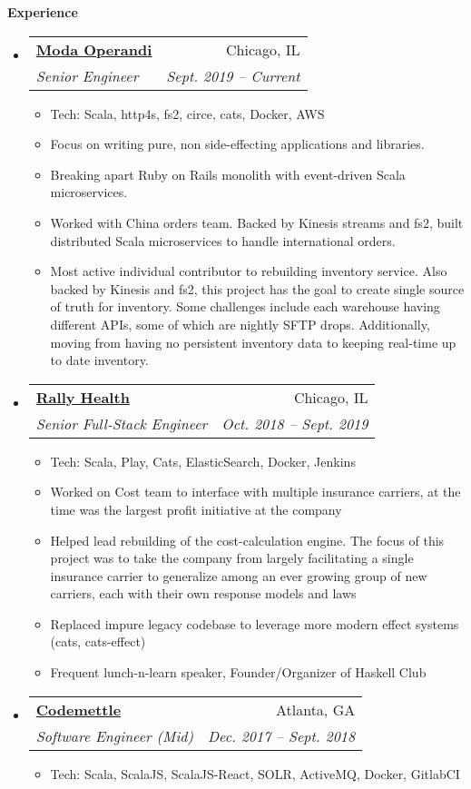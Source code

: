 \documentclass[letterpaper,11pt]{article}
\makeatletter
\newcommand{\resitem}[1]{\item #1 \vspace{-2pt}}
\newcommand{\resheading}[1]{{\large \colorbox{mygrey}{\begin{minipage}{\textwidth}{\textbf{#1 \vphantom{p\^{E}}}}\end{minipage}}}}
\newcommand{\ressubheading}[4]{
\begin{tabular*}{6.5in}{l@{\extracolsep{\fill}}r}
		\textbf{#1} & #2 \\
		\textit{#3} & \textit{#4} \\
\end{tabular*}\vspace{-6pt}}
\makeatother
\begin{document}
\resheading{Experience}
\begin{itemize}
\item
  \ressubheading{\href{http://www.modaoperandi.com/}{Moda Operandi}}{Chicago, IL}{Senior Engineer}{Sept. 2019 -- Current}
    { \footnotesize
    \begin{itemize}
        \resitem{Tech: Scala, http4s, fs2, circe, cats, Docker, AWS}
        \resitem{Focus on writing pure, non side-effecting applications and libraries.}
        \resitem{Breaking apart Ruby on Rails monolith with event-driven Scala microservices.}
        \resitem{Worked with China orders team. Backed by Kinesis streams and fs2, built distributed Scala
        microservices to handle international orders.}
        \resitem{Most active individual contributor to rebuilding inventory
        service. Also backed by Kinesis and fs2, this project has the goal to
        create single source of truth for inventory. Some challenges include
        each warehouse having different APIs, some of which are nightly SFTP
        drops.  Additionally, moving from having no persistent inventory data
        to keeping real-time up to date inventory.}
    \end{itemize}
    }
\item
  \ressubheading{\href{http://www.rallyhealth.com/}{Rally Health}}{Chicago, IL}{Senior Full-Stack Engineer}{Oct. 2018 -- Sept. 2019}
    { \footnotesize
    \begin{itemize}
        \resitem{Tech: Scala, Play, Cats, ElasticSearch, Docker, Jenkins}
        \resitem{Worked on Cost team to interface with multiple insurance carriers, at the time was the largest profit initiative at the company}
        \resitem{Helped lead rebuilding of the cost-calculation engine. The focus of this project was to take the company from largely 
        facilitating a single insurance carrier to generalize among an ever growing group of new carriers, each with their own response models
        and laws}
        \resitem{Replaced impure legacy codebase to leverage more modern effect systems (cats, cats-effect)}
        \resitem{Frequent lunch-n-learn speaker, Founder/Organizer of Haskell Club}
    \end{itemize}
    }
\item
  \ressubheading{\href{http://www.codemettle.com/}{Codemettle}}{Atlanta, GA}{Software Engineer (Mid)}{Dec. 2017 -- Sept. 2018}
    { \footnotesize
    \begin{itemize}
        \resitem{Tech: Scala, ScalaJS, ScalaJS-React, SOLR, ActiveMQ, Docker, GitlabCI}

\end{itemize}}
\end{itemize}
\end{document}
